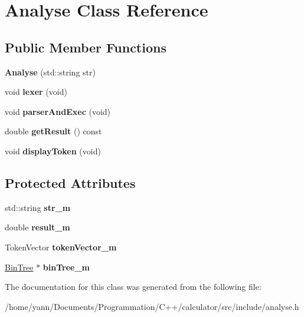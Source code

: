 \hypertarget{class_analyse}{\section{Analyse Class Reference}
\label{class_analyse}
}
\subsection*{Public Member Functions}
\begin{DoxyCompactItemize}
\item 
\hypertarget{class_analyse_a58dffeb88781b6f66f32ed5536a3dc2b}{{\bfseries Analyse} (std\-::string str)}\label{class_analyse_a58dffeb88781b6f66f32ed5536a3dc2b}

\item 
\hypertarget{class_analyse_aff1a78a8c6cb282820fdbefee302c4a8}{void {\bfseries lexer} (void)}\label{class_analyse_aff1a78a8c6cb282820fdbefee302c4a8}

\item 
\hypertarget{class_analyse_a2714cd48d2d902800407d56e23351440}{void {\bfseries parser\-And\-Exec} (void)}\label{class_analyse_a2714cd48d2d902800407d56e23351440}

\item 
\hypertarget{class_analyse_a7eb131b3026496b43560657b624c8788}{double {\bfseries get\-Result} () const }\label{class_analyse_a7eb131b3026496b43560657b624c8788}

\item 
\hypertarget{class_analyse_a77d54e46123bd219487cf2e2479402e6}{void {\bfseries display\-Token} (void)}\label{class_analyse_a77d54e46123bd219487cf2e2479402e6}

\end{DoxyCompactItemize}
\subsection*{Protected Attributes}
\begin{DoxyCompactItemize}
\item 
\hypertarget{class_analyse_ace0383d76445d4f32322f7e714b2bf48}{std\-::string {\bfseries str\-\_\-m}}\label{class_analyse_ace0383d76445d4f32322f7e714b2bf48}

\item 
\hypertarget{class_analyse_ab3b9069ef8f159ca3bfe130570b41dd0}{double {\bfseries result\-\_\-m}}\label{class_analyse_ab3b9069ef8f159ca3bfe130570b41dd0}

\item 
\hypertarget{class_analyse_aab3807087a5686bb6857c9b9e6c05046}{Token\-Vector {\bfseries token\-Vector\-\_\-m}}\label{class_analyse_aab3807087a5686bb6857c9b9e6c05046}

\item 
\hypertarget{class_analyse_a6539243dd10704caff86d24152859ffb}{\hyperlink{class_bin_tree}{Bin\-Tree} $\ast$ {\bfseries bin\-Tree\-\_\-m}}\label{class_analyse_a6539243dd10704caff86d24152859ffb}

\end{DoxyCompactItemize}


The documentation for this class was generated from the following file\-:\begin{DoxyCompactItemize}
\item 
/home/yann/\-Documents/\-Programmation/\-C++/calculator/src/include/analyse.\-h\end{DoxyCompactItemize}
